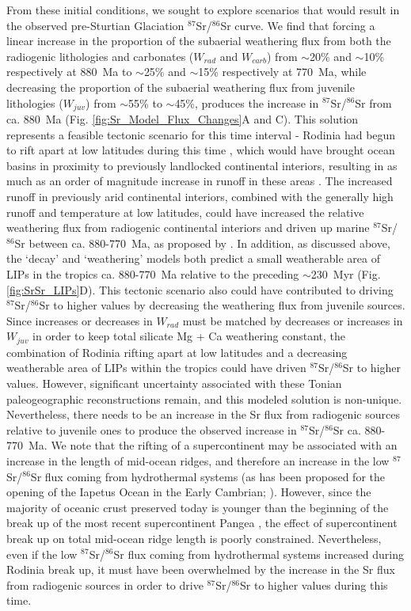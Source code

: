 \documentclass[11pt,letterpaper]{article}
\newcommand{\SrSr}{$^{87}$Sr/$^{86}$Sr\xspace}
\begin{document}
From these initial conditions, we sought to explore scenarios that would result in the observed pre-Sturtian Glaciation \SrSr curve. We find that forcing a linear increase in the proportion of the subaerial weathering flux from both the radiogenic lithologies and carbonates ($W_{rad}$ and $W_{carb}$) from $\sim$20\% and $\sim$10\% respectively at 880~Ma to $\sim$25\% and $\sim$15\% respectively at 770~Ma, while decreasing the proportion of the subaerial weathering flux from juvenile lithologies ($W_{juv}$) from $\sim$55\% to $\sim$45\%, produces the increase in \SrSr from ca. 880~Ma (Fig. \ref{fig:Sr_Model_Flux_Changes}A and C). This solution represents a feasible tectonic scenario for this time interval - Rodinia had begun to rift apart at low latitudes during this time \citep{Li2008a}, which would have brought ocean basins in proximity to previously landlocked continental interiors, resulting in as much as an order of magnitude increase in runoff in these areas \citep{Godderis2017a}. The increased runoff in previously arid continental interiors, combined with the generally high runoff and temperature at low latitudes, could have increased the relative weathering flux from radiogenic continental interiors and driven up marine \SrSr between ca. 880-770~Ma, as proposed by \citet{Halverson2007b}. In addition, as discussed above, the `decay' and `weathering' models both predict a small weatherable area of LIPs in the tropics ca. 880-770~Ma relative to the preceding $\sim$230~Myr (Fig. \ref{fig:SrSr_LIPs}D). This tectonic scenario also could have contributed to driving \SrSr to higher values by decreasing the weathering flux from juvenile sources. Since increases or decreases in $W_{rad}$ must be matched by decreases or increases in $W_{juv}$ in order to keep total silicate Mg + Ca weathering constant, the combination of Rodinia rifting apart at low latitudes and a decreasing weatherable area of LIPs within the tropics could have driven \SrSr to higher values. However, significant uncertainty associated with these Tonian paleogeographic reconstructions remain, and this modeled solution is non-unique. Nevertheless, there needs to be an increase in the Sr flux from radiogenic sources relative to juvenile ones to produce the observed increase in \SrSr ca. 880-770~Ma. We note that the rifting of a supercontinent may be associated with an increase in the length of mid-ocean ridges, and therefore an increase in the low \SrSr flux coming from hydrothermal systems (as has been proposed for the opening of the Iapetus Ocean in the Early Cambrian; \citealp{Maloof2010a}). However, since the majority of oceanic crust preserved today is younger than the beginning of the break up of the most recent supercontinent Pangea \citep{Muller2008a}, the effect of supercontinent break up on total mid-ocean ridge length is poorly constrained. Nevertheless, even if the low \SrSr flux coming from hydrothermal systems increased during Rodinia break up, it must have been overwhelmed by the increase in the Sr flux from radiogenic sources in order to drive \SrSr to higher values during this time.
\end{document}
